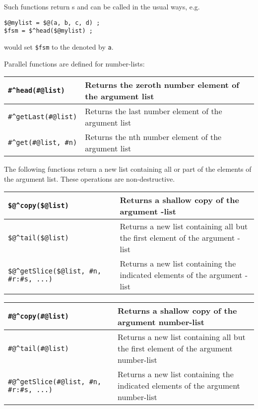 \vspace{.5cm}

\noindent
Such functions return \fsm{}s and can be called in the usual ways, 
e.g.

\begin{Verbatim}
$@mylist = $@(a, b, c, d) ;
$fsm = $^head($@mylist) ;
\end{Verbatim}

\noindent
would set \verb!$fsm! to the \fsm{} denoted by \texttt{a}.

Parallel functions are defined for number-lists:

\vspace{.5cm}

\noindent
\begin{tabular}{|l|l|}
\hline
\verb!#^head(#@list)! & Returns the zeroth number element of the argument list\\
\hline
\verb!#^getLast(#@list)! & Returns the last number element of the argument list\\
\hline
\verb!#^get(#@list, #n)! & Returns the nth number element of the argument list\\
\hline
\end{tabular}

\vspace{.5cm}

The following functions return a new list containing all or part of the
elements of the argument list.  These operations are non-destructive.

\vspace{.5cm}

\noindent
\begin{tabular}{|l|p{4.5cm}|}
\hline
\verb!$@^copy($@list)! & Returns a shallow copy of the argument \fsm{}-list\\
\hline
\verb!$@^tail($@list)! & Returns a new list containing all but the first element of the
argument \fsm{}-list\\
\hline
\verb!$@^getSlice($@list, #n, #r:#s, ...)! & Returns a new list containing the
indicated elements of the argument \fsm{}-list\\
\hline
\end{tabular}

\vspace{.5cm}

\noindent
\begin{tabular}{|l|p{4.5cm}|}
\hline
\verb!#@^copy(#@list)! & Returns a shallow copy of the argument number-list\\
\hline
\verb!#@^tail(#@list)! & Returns a new list containing all but the first element of the
argument number-list\\
\hline
\verb!#@^getSlice(#@list, #n, #r:#s, ...)! & Returns a new list containing the
indicated elements of the argument number-list\\
\hline
\end{tabular}

